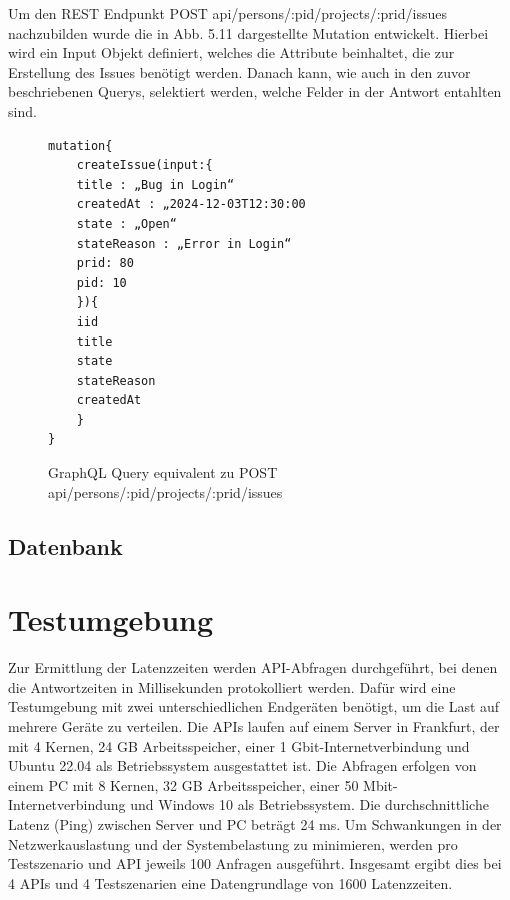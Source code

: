 \noindent
Um den REST Endpunkt POST api/persons/:pid/projects/:prid/issues nachzubilden wurde die in Abb. 5.11 dargestellte Mutation entwickelt. Hierbei wird ein Input Objekt definiert, welches die Attribute beinhaltet, die zur Erstellung des Issues benötigt werden. Danach kann, wie auch in den zuvor beschriebenen Querys, selektiert werden, welche Felder in der Antwort entahlten sind.
\begin{figure}[H]
\begin{center}
\begin{BVerbatim}
mutation{
    createIssue(input:{
	title : „Bug in Login“
	createdAt : „2024-12-03T12:30:00
	state : „Open“
	stateReason : „Error in Login“
	prid: 80
	pid: 10
	}){
	iid
	title
	state
	stateReason
	createdAt
    }
}
\end{BVerbatim}
\end{center}
\caption{GraphQL Query equivalent zu POST api/persons/:pid/projects/:prid/issues}
\end{figure}

\label{sec:graphql}

\subsection{Datenbank}
\label{sec:datenbank}


\section{Testumgebung} %
\label{sec:testumgebung}
Zur Ermittlung der Latenzzeiten werden API-Abfragen durchgeführt, bei denen die Antwortzeiten in Millisekunden protokolliert werden. Dafür wird eine Testumgebung mit zwei unterschiedlichen Endgeräten benötigt, um die Last auf mehrere Geräte zu verteilen. Die APIs laufen auf einem Server in Frankfurt, der mit 4 Kernen, 24 GB Arbeitsspeicher, einer 1 Gbit-Internetverbindung und Ubuntu 22.04 als Betriebssystem ausgestattet ist.
Die Abfragen erfolgen von einem PC mit 8 Kernen, 32 GB Arbeitsspeicher, einer 50 Mbit-Internetverbindung und Windows 10 als Betriebssystem. Die durchschnittliche Latenz (Ping) zwischen Server und PC beträgt 24 ms. Um Schwankungen in der Netzwerkauslastung und der Systembelastung zu minimieren, werden pro Testszenario und API jeweils 100 Anfragen ausgeführt. Insgesamt ergibt dies bei 4 APIs und 4 Testszenarien eine Datengrundlage von 1600 Latenzzeiten.





